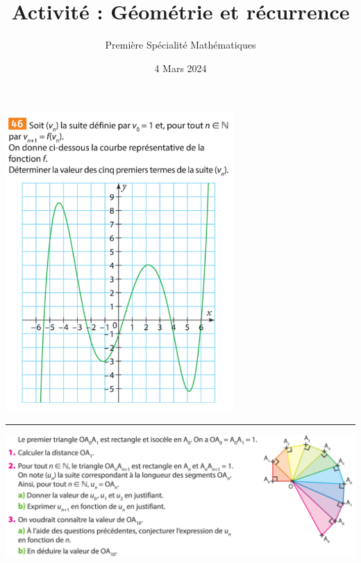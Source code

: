 \documentclass{article}
\title{Activité : Géométrie et récurrence}
\author{Première Spécialité Mathématiques}
\date{4 Mars 2024}
\begin{document}
\maketitle
\begin{center}    
\includegraphics[width=0.65\textwidth]{Activite_geometrie_recurrence_2.png}
\rule{\textwidth}{0.4pt}
\includegraphics[width=\textwidth]{Activite_geometrie_recurrence.png}
\end{center}
\end{document}
